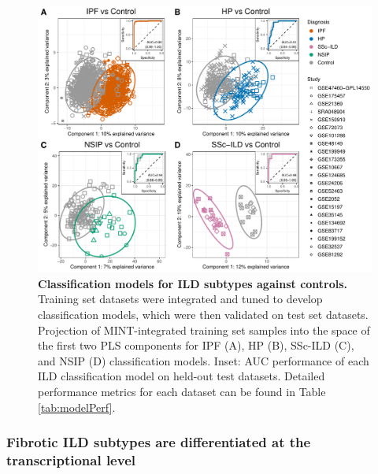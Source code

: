 \documentclass[
]{article}
\begin{document}
\begin{figure}

{\centering \includegraphics[width=1\linewidth,]{./Figures/SysReview/Figure3_MINT} 

}

\caption[MINT models]{\textbf{Classification models for ILD subtypes against controls.} Training set datasets were integrated and tuned to develop classification models, which were then validated on test set datasets. Projection of MINT-integrated training set samples into the space of the first two PLS components for IPF (A), HP (B), SSc-ILD (C), and NSIP (D) classification models. Inset: AUC performance of each ILD classification model on held-out test datasets. Detailed performance metrics for each dataset can be found in Table \ref{tab:modelPerf}.}\label{fig:mintmodel}
\end{figure}

\subsubsection{Fibrotic ILD subtypes are differentiated at the transcriptional level}\label{fibrotic-ild-subtypes-are-differentiated-at-the-transcriptional-level}
\end{document}
